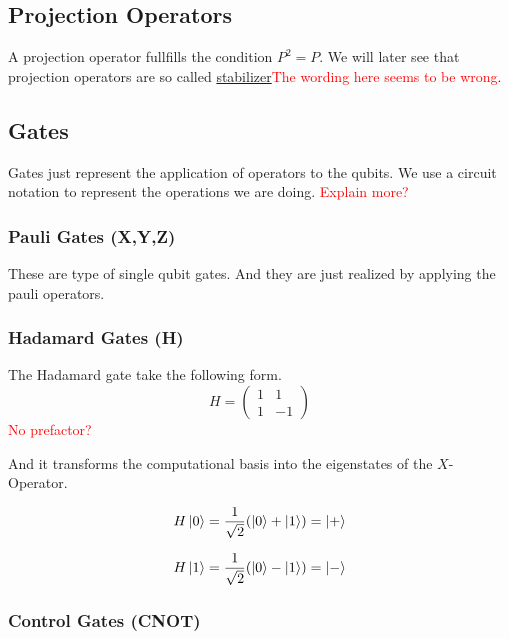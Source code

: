 \subsection{Projection Operators}\label{sec:basic.math.projection_operator}

A projection operator fullfills the condition $P^2=P$.
We will later see that projection operators are so called \hyperref[sec:basic.qc.stabilizer]{stabilizer}\textcolor{red}{The wording here seems to be wrong}.


\subsection{Gates}\label{sec:basic.math.gates}
Gates just represent the application of operators to the qubits. 
We use a circuit notation to represent the operations we are doing.
\textcolor{red}{Explain more?}


\subsubsection{Pauli Gates (X,Y,Z)}\label{sec:basic.math.gates.paui}
These are type of single qubit gates. And they are just realized by applying the pauli operators. 

\subsubsection{Hadamard Gates (H)}\label{sec:basic.math.gates.hadamard}
The Hadamard gate take the following form.
\begin{equation}
H=    
\begin{pmatrix}
1 & 1  \\
1 & -1  
\end{pmatrix}
\end{equation}
\textcolor{red}{No prefactor?}

And it transforms the computational basis into the eigenstates of the $X$-Operator.

\begin{equation}
    H\ket{0} = \frac{1}{\sqrt{2}} (\ket{0} + \ket{1}) = \ket{+}
\end{equation}

\begin{equation}
    H\ket{1} = \frac{1}{\sqrt{2}} (\ket{0} - \ket{1}) = \ket{-}
\end{equation}

\subsubsection{Control Gates (CNOT)}\label{sec:basic.math.gates.cnot}

